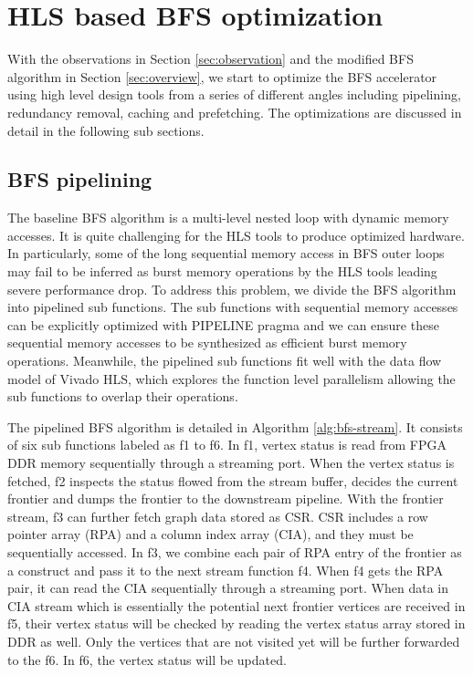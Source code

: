 \section{HLS based BFS optimization} \label{sec:bfs-opt}
With the observations in Section \ref{sec:observation} 
and the modified BFS algorithm in Section \ref{sec:overview}, 
we start to optimize the BFS accelerator using high level design tools 
from a series of different angles including pipelining, redundancy 
removal, caching and prefetching. The optimizations are discussed in 
detail in the following sub sections.

\subsection{BFS pipelining}
The baseline BFS algorithm is a multi-level nested loop with 
dynamic memory accesses. It is quite challenging for the HLS 
tools to produce optimized hardware. In particularly, some of the 
long sequential memory access in BFS outer loops 
may fail to be inferred as burst memory operations by the HLS tools 
leading severe performance drop.
To address this problem, we divide the BFS algorithm into pipelined 
sub functions. The sub functions with sequential memory accesses 
can be explicitly optimized with PIPELINE pragma and we can ensure 
these sequential memory accesses to be synthesized as efficient 
burst memory operations. Meanwhile, the pipelined sub functions 
fit well with the data flow model of Vivado HLS, 
which explores the function level parallelism allowing the 
sub functions to overlap their operations.

The pipelined BFS algorithm is detailed in Algorithm \ref{alg:bfs-stream}. 
It consists of six sub functions 
labeled as f1 to f6. In f1, vertex status is read from 
FPGA DDR memory sequentially through a streaming port. 
When the vertex status is fetched, f2 inspects the status 
flowed from the stream buffer, decides the current frontier 
and dumps the frontier to the downstream pipeline. 
With the frontier stream, f3 can further fetch graph 
data stored as CSR. CSR includes a row pointer array (RPA) 
and a column index array (CIA), and they must be sequentially accessed. 
In f3, we combine each pair of RPA entry of the frontier as a construct 
and pass it to the next stream function f4. When f4 gets the RPA pair, 
it can read the CIA sequentially through a streaming port. 
When data in CIA stream which is essentially the potential 
next frontier vertices are received in f5, their vertex status 
will be checked by reading the vertex status array stored in DDR as well.
Only the vertices that are not visited yet will be further forwarded to the f6. 
In f6, the vertex status will be updated.

